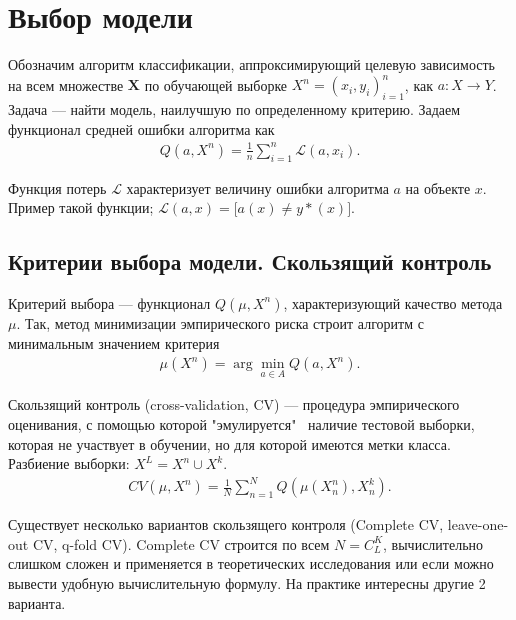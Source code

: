 \documentclass[12pt]{article}
\begin{document}
	
	\newpage
	
	\section{Выбор модели}
	
	Обозначим алгоритм классификации, аппроксимирующий целевую зависимость на всем множестве $\mathbf{X}$ по обучающей выборке ${X}^n = (x_i, y_i)_{i = 1}^{n}$, как $a : X \rightarrow Y$. Задача --- найти модель, наилучшую по определенному критерию. Задаем функционал средней ошибки алгоритма как
	\begin{eqnarray}\label{error}  
		Q(a, {X}^n)=\frac{1}{n} \sum_{i = 1}^{n} \mathcal{L} (a, x_i). 
	\end{eqnarray}
	
	Функция потерь $\mathcal{L}$ характеризует величину ошибки алгоритма $a$ на объекте $x$. Пример такой функции; $\mathcal{L}(a, x) = [a(x) \neq y*$$(x)]$.
	
	\subsection{Критерии выбора модели. Скользящий контроль}
	
	Критерий выбора --- функционал $Q(\mu, {X}^n)$, характеризующий качество метода $\mu$. Так, метод минимизации эмпирического риска строит алгоритм с минимальным значением критерия
	\begin{eqnarray}\label{Min_error_criterion}  
		\mu ({X}^n) = \arg \min _{{a \in A}} Q(a, {X}^n). 
	\end{eqnarray}
	
	Скользящий контроль (cross-validation, CV) --- процедура эмпирического оценивания, с помощью которой "эмулируется" \ наличие тестовой выборки, которая не участвует в обучении, но для которой имеются метки класса. Разбиение выборки: ${X}^L = {X}^n \cup {X}^k$. 
	\begin{eqnarray}\label{CV}  
		CV (\mu, {X}^n) =\frac{1}{N} \sum_{n = 1}^{N} Q (\mu(X_{n}^{n}), X_{n}^{k}). 
	\end{eqnarray}
	
	Существует несколько вариантов скользящего контроля (Complete CV, leave-one-out CV, q-fold CV). Complete CV строится по всем $N = C_{L}^{K}$, вычислительно слишком сложен и применяется в теоретических исследования или если можно вывести удобную вычислительную формулу. На практике интересны другие 2 варианта. 
\end{document}
